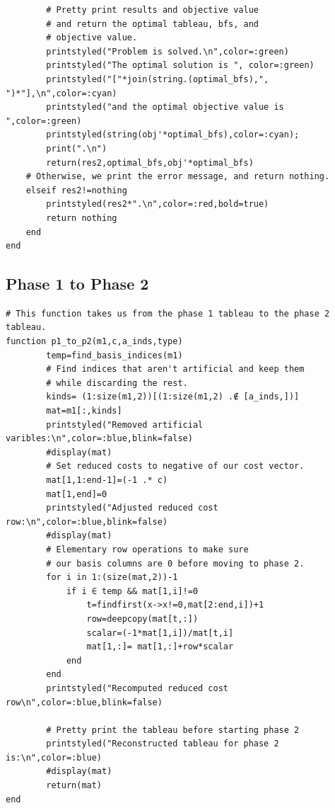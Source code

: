 \documentclass[11pt]{article}
\begin{document}
\begin{verbatim}
        # Pretty print results and objective value
        # and return the optimal tableau, bfs, and
        # objective value.
        printstyled("Problem is solved.\n",color=:green)
        printstyled("The optimal solution is ", color=:green)
        printstyled("["*join(string.(optimal_bfs),", ")*"],\n",color=:cyan)
        printstyled("and the optimal objective value is ",color=:green)
        printstyled(string(obj'*optimal_bfs),color=:cyan);
        print(".\n")
        return(res2,optimal_bfs,obj'*optimal_bfs)
    # Otherwise, we print the error message, and return nothing.
    elseif res2!=nothing
        printstyled(res2*".\n",color=:red,bold=true)
        return nothing
    end
end
\end{verbatim}

\subsection{Phase 1 to Phase 2}
\label{sec:org3190fe4}
\begin{verbatim}
# This function takes us from the phase 1 tableau to the phase 2 tableau.
function p1_to_p2(m1,c,a_inds,type)
        temp=find_basis_indices(m1)
        # Find indices that aren't artificial and keep them
        # while discarding the rest.
        kinds= (1:size(m1,2))[(1:size(m1,2) .∉ [a_inds,])]
        mat=m1[:,kinds]
        printstyled("Removed artificial varibles:\n",color=:blue,blink=false)
        #display(mat)
        # Set reduced costs to negative of our cost vector.
        mat[1,1:end-1]=(-1 .* c)
        mat[1,end]=0
        printstyled("Adjusted reduced cost row:\n",color=:blue,blink=false)
        #display(mat)
        # Elementary row operations to make sure
        # our basis columns are 0 before moving to phase 2.
        for i in 1:(size(mat,2))-1
            if i ∈ temp && mat[1,i]!=0
                t=findfirst(x->x!=0,mat[2:end,i])+1
                row=deepcopy(mat[t,:])
                scalar=(-1*mat[1,i])/mat[t,i]
                mat[1,:]= mat[1,:]+row*scalar
            end
        end
        printstyled("Recomputed reduced cost row\n",color=:blue,blink=false)

        # Pretty print the tableau before starting phase 2
        printstyled("Reconstructed tableau for phase 2 is:\n",color=:blue)
        #display(mat)
        return(mat)
end
\end{verbatim}
\end{document}
